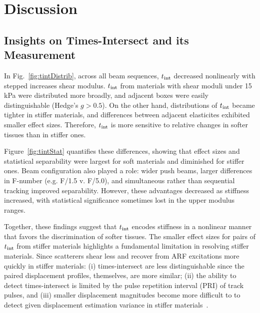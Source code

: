 \section{Discussion}
\label{sec:discussion}

\subsection{Insights on Times-Intersect and its Measurement}

In Fig.~\ref{fig:tintDistrib}, across all beam sequences, $t_{\textnormal{int}}$ decreased nonlinearly with stepped increases shear modulus. $t_{\textnormal{int}}$ from materials with shear moduli under 15 kPa were distributed more broadly, and adjacent boxes were easily distinguishable (Hedge's $g > 0.5$). On the other hand, distributions of $t_{\textnormal{int}}$ became tighter in stiffer materials, and differences between adjacent elasticites exhibited smaller effect sizes. Therefore, $t_{\textnormal{int}}$ is more sensitive to relative changes in softer tissues than in stiffer ones.

Figure~\ref{fig:tintStat} quantifies these differences, showing that effect sizes and statistical separability were largest for soft materials and diminished for stiffer ones. Beam configuration also played a role: wider push beams, larger differences in F-number (e.g. F/1.5 v. F/5.0), and simultaneous rather than sequential tracking improved separability. However, these advantages decreased as stiffness increased, with statistical significance sometimes lost in the upper modulus ranges.

Together, these findings suggest that $t_{\textnormal{int}}$ encodes stiffness in a nonlinear manner that favors the discrimination of softer tissues. The smaller effect sizes for pairs of $t_{\textnormal{int}}$ from stiffer materials highlights a fundamental limitation in resolving stiffer materials. Since scatterers shear less and recover from ARF excitations more quickly in stiffer materials: (i) times-intersect are less distinguishable since the paired displacement profiles, themselves, are more similar; (ii) the ability to detect times-intersect is limited by the pulse repetition interval (PRI) of track pulses, and (iii) smaller displacement magnitudes become more difficult to to detect given displacement estimation variance in stiffer materials~\cite{mcaleavey_Estimates_2003,dhanaliwala_Assessing_2012}.

